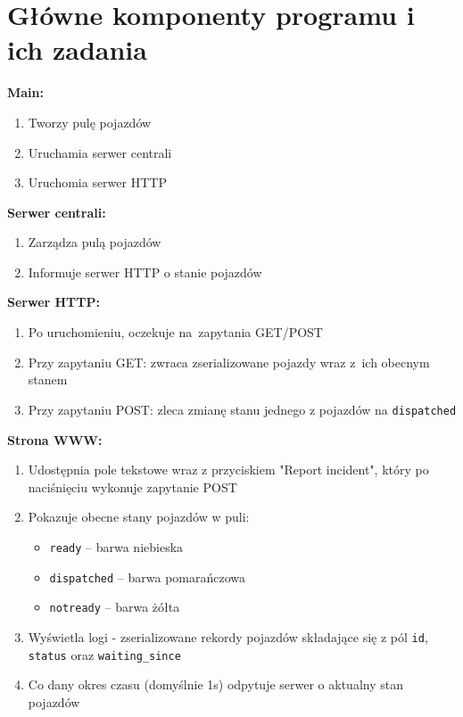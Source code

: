 \documentclass{article}
\begin{document}
\section{Główne komponenty programu i ich zadania}
\textbf{Main:}
\begin{enumerate}
	\item Tworzy pulę pojazdów
	\item Uruchamia serwer centrali
	\item Uruchomia serwer HTTP
\end{enumerate}

\textbf{Serwer centrali:}
\begin{enumerate}
	\item Zarządza pulą pojazdów
	\item Informuje serwer HTTP o stanie pojazdów
\end{enumerate}

\textbf{Serwer HTTP:}
\begin{enumerate}
	\item Po uruchomieniu, oczekuje na~zapytania GET/POST
	\item Przy zapytaniu GET: zwraca zserializowane pojazdy wraz z~ich obecnym stanem
	\item Przy zapytaniu POST: zleca zmianę stanu jednego z pojazdów na \texttt{dispatched}
\end{enumerate}

\textbf{Strona WWW:}
\begin{enumerate}
	\item Udostępnia pole tekstowe wraz z przyciskiem "Report incident", który po naciśnięciu wykonuje zapytanie POST
	\item Pokazuje obecne stany pojazdów w puli:
		\begin{itemize}
			\item \texttt{ready} -- barwa niebieska
			\item \texttt{dispatched} -- barwa pomarańczowa
			\item \texttt{notready} -- barwa żółta
		\end{itemize}
	\item Wyświetla logi - zserializowane rekordy pojazdów składające się z pól \texttt{id}, \texttt{status} oraz \texttt{waiting\_since}
	\item Co dany okres czasu (domyślnie 1s) odpytuje serwer o aktualny stan pojazdów
\end{enumerate}
\end{document}

